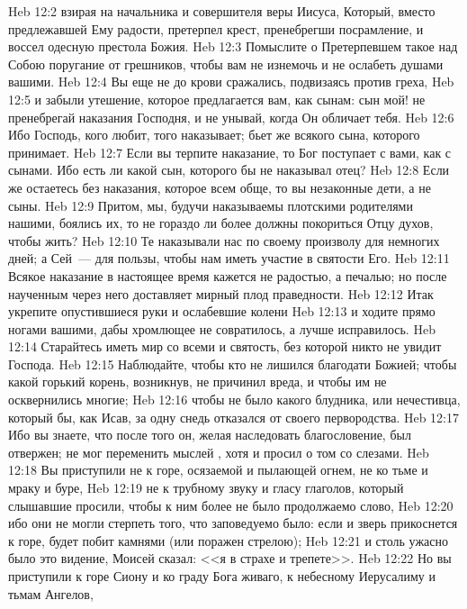 \vs Heb 12:2 взирая на начальника и совершителя веры Ии\-су\-са, Который, вместо предлежавшей Ему радости, претерпел крест, пренебрегши посрамление, и воссел одесную престола Божия.
\vs Heb 12:3 Помыслите о Претерпевшем такое над Собою поругание от грешников, чтобы вам не изнемочь и не ослабеть душами вашими.
\vs Heb 12:4 Вы еще не до крови сражались, подвизаясь против греха,
\vs Heb 12:5 и забыли утешение, которое предлагается вам, как сынам: сын мой! не пренебрегай наказания Господня, и не унывай, когда Он обличает тебя.
\vs Heb 12:6 Ибо Господь, кого любит, того наказывает; бьет же всякого сына, которого принимает.
\vs Heb 12:7 Если вы терпите наказание, то Бог поступает с вами, как с сынами. Ибо есть ли какой сын, которого бы не наказывал отец?
\vs Heb 12:8 Если же остаетесь без наказания, которое всем обще, то вы незаконные дети, а не сыны.
\vs Heb 12:9 Притом,  мы, будучи наказываемы плотскими родителями нашими, боялись их, то не гораздо ли более должны покориться Отцу духов, чтобы жить?
\vs Heb 12:10 Те наказывали нас по своему произволу для немногих дней; а Сей~--- для пользы, чтобы нам иметь участие в святости Его.
\vs Heb 12:11 Всякое наказание в настоящее время кажется не радостью, а печалью; но после наученным через него доставляет мирный плод праведности.
\vs Heb 12:12 Итак укрепите опустившиеся руки и ослабевшие колени
\vs Heb 12:13 и ходите прямо ногами вашими, дабы хромлющее не совратилось, а лучше исправилось.
\vs Heb 12:14 Старайтесь иметь мир со всеми и святость, без которой никто не увидит Господа.
\vs Heb 12:15 Наблюдайте, чтобы кто не лишился благодати Божией; чтобы какой горький корень, возникнув, не причинил вреда, и чтобы им не осквернились многие;
\vs Heb 12:16 чтобы не было  какого блудника, или нечестивца, который бы, как Исав, за одну снедь отказался от своего первородства.
\vs Heb 12:17 Ибо вы знаете, что после того он, желая наследовать благословение, был отвержен; не мог переменить мыслей , хотя и просил о том со слезами.
\rsbpar\vs Heb 12:18 Вы приступили не к горе, осязаемой и пылающей огнем, не ко тьме и мраку и буре,
\vs Heb 12:19 не к трубному звуку и гласу глаголов, который слышавшие просили, чтобы к ним более не было продолжаемо слово,
\vs Heb 12:20 ибо они не могли стерпеть того, что заповедуемо было: если и зверь прикоснется к горе, будет побит камнями (или поражен стрелою);
\vs Heb 12:21 и столь ужасно было это видение,  Моисей сказал: <<я в страхе и трепете>>.
\vs Heb 12:22 Но вы приступили к горе Сиону и ко граду Бога живаго, к небесному Иерусалиму и тьмам Ангелов,
